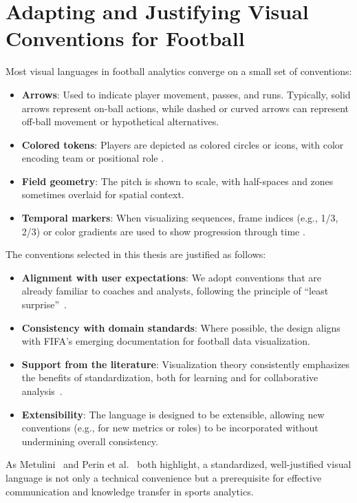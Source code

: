 \documentclass[11pt,a4paper,openright]{report}
\begin{document}
\section{Adapting and Justifying Visual Conventions for Football}
Most visual languages in football analytics converge on a small set of conventions:
\begin{itemize}
    \item \textbf{Arrows}: Used to indicate player movement, passes, and runs. Typically, solid arrows represent on-ball actions, while dashed or curved arrows can represent off-ball movement or hypothetical alternatives.
    \item \textbf{Colored tokens}: Players are depicted as colored circles or icons, with color encoding team or positional role \cite{perin2013soccerstories, metulini2016spatio}.
    \item \textbf{Field geometry}: The pitch is shown to scale, with half-spaces and zones sometimes overlaid for spatial context.
    \item \textbf{Temporal markers}: When visualizing sequences, frame indices (e.g., 1/3, 2/3) or color gradients are used to show progression through time \cite{sacha2014feature, aigner2007visualizing}.
\end{itemize}

The conventions selected in this thesis are justified as follows:
\begin{itemize}
    \item \textbf{Alignment with user expectations}: We adopt conventions that are already familiar to coaches and analysts, following the principle of ``least surprise''~\cite{munzner2014visualization}.
    \item \textbf{Consistency with domain standards}: Where possible, the design aligns with FIFA's emerging documentation for football data visualization.
    \item \textbf{Support from the literature}: Visualization theory consistently emphasizes the benefits of standardization, both for learning and for collaborative analysis~\cite{bertin2011semiology, ware2013information}.
    \item \textbf{Extensibility}: The language is designed to be extensible, allowing new conventions (e.g., for new metrics or roles) to be incorporated without undermining overall consistency.
\end{itemize}

As Metulini~\cite{metulini2016spatio} and Perin et al.~\cite{perin2013soccerstories} both highlight, a standardized, well-justified visual language is not only a technical convenience but a prerequisite for effective communication and knowledge transfer in sports analytics.
\end{document}
